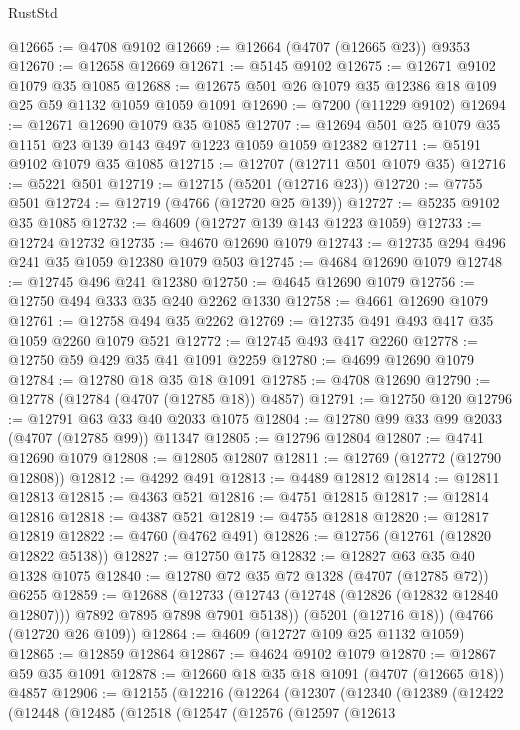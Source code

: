 \begin{lexlean}{RustStd}
\begin{coremodule}
@12665 := @4708 @9102
@12669 := @12664 (@4707 (@12665 @23)) @9353
@12670 := @12658 @12669
@12671 := @5145 @9102
@12675 := @12671 @9102 @1079 @35 @1085
@12688 := @12675 @501 @26 @1079 @35 @12386 @18 @109 @25 @59 @1132 @1059 @1059 @1091
@12690 := @7200 (@11229 @9102)
@12694 := @12671 @12690 @1079 @35 @1085
@12707 := @12694 @501 @25 @1079 @35 @1151 @23 @139 @143 @497 @1223 @1059 @1059 @12382
@12711 := @5191 @9102 @1079 @35 @1085
@12715 := @12707 (@12711 @501 @1079 @35)
@12716 := @5221 @501
@12719 := @12715 (@5201 (@12716 @23))
@12720 := @7755 @501
@12724 := @12719 (@4766 (@12720 @25 @139))
@12727 := @5235 @9102 @35 @1085
@12732 := @4609 (@12727 @139 @143 @1223 @1059)
@12733 := @12724 @12732
@12735 := @4670 @12690 @1079
@12743 := @12735 @294 @496 @241 @35 @1059 @12380 @1079 @503
@12745 := @4684 @12690 @1079
@12748 := @12745 @496 @241 @12380
@12750 := @4645 @12690 @1079
@12756 := @12750 @494 @333 @35 @240 @2262 @1330
@12758 := @4661 @12690 @1079
@12761 := @12758 @494 @35 @2262
@12769 := @12735 @491 @493 @417 @35 @1059 @2260 @1079 @521
@12772 := @12745 @493 @417 @2260
@12778 := @12750 @59 @429 @35 @41 @1091 @2259
@12780 := @4699 @12690 @1079
@12784 := @12780 @18 @35 @18 @1091
@12785 := @4708 @12690
@12790 := @12778 (@12784 (@4707 (@12785 @18)) @4857)
@12791 := @12750 @120
@12796 := @12791 @63 @33 @40 @2033 @1075
@12804 := @12780 @99 @33 @99 @2033 (@4707 (@12785 @99)) @11347
@12805 := @12796 @12804
@12807 := @4741 @12690 @1079
@12808 := @12805 @12807
@12811 := @12769 (@12772 (@12790 @12808))
@12812 := @4292 @491
@12813 := @4489 @12812
@12814 := @12811 @12813
@12815 := @4363 @521
@12816 := @4751 @12815
@12817 := @12814 @12816
@12818 := @4387 @521
@12819 := @4755 @12818
@12820 := @12817 @12819
@12822 := @4760 (@4762 @491)
@12826 := @12756 (@12761 (@12820 @12822 @5138))
@12827 := @12750 @175
@12832 := @12827 @63 @35 @40 @1328 @1075
@12840 := @12780 @72 @35 @72 @1328 (@4707 (@12785 @72)) @6255
@12859 := @12688
    (@12733 (@12743 (@12748 (@12826 (@12832 @12840 @12807))) @7892 @7895 @7898 @7901 @5138))
    (@5201 (@12716 @18))
    (@4766 (@12720 @26 @109))
@12864 := @4609 (@12727 @109 @25 @1132 @1059)
@12865 := @12859 @12864
@12867 := @4624 @9102 @1079
@12870 := @12867 @59 @35 @1091
@12878 := @12660 @18 @35 @18 @1091 (@4707 (@12665 @18)) @4857
@12906 := @12155
    (@12216
      (@12264
        (@12307
          (@12340
            (@12389
              (@12422
                (@12448
                  (@12485
                    (@12518
                      (@12547
                        (@12576
                          (@12597
                            (@12613

\end{coremodule}
\end{lexlean}
